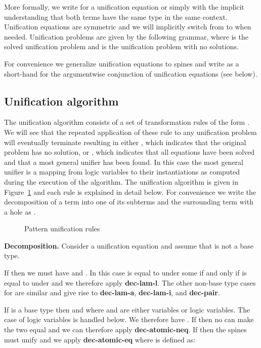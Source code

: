 \documentclass{eptcs}
\theoremstyle{definition}
\begin{document}
More formally, we write  for a unification equation 
or simply  with the implicit understanding that both
terms have the same type in the same context.
Unification equations are symmetric and we will implicitly
switch from  to  when needed.  Unification
problems are given by the following grammar, where  is the
solved unification problem and  is the unification problem
with no solutions.

For convenience we generalize unification equations to spines
and write  as a
short-hand for the argumentwise conjunction of unification equations
(see below).


\subsection{Unification algorithm}\label{sec:unification}
The unification algorithm consists of a set of
transformation rules of the form .   We will see 
that the repeated application of these rule to any unification problem 
will eventually terminate resulting in  either , which indicates that the original problem has
no solution, or , which indicates that all equations have been
solved and that a most general unifier has been found.  In this case the
most general unifier is a mapping from logic variables to their
instantiations as computed during the execution of the
algorithm.  The unification algorithm is given in
Figure~\ref{fig:pat-unif} and each rule is explained in detail below.
For convenience we write the decomposition of a term  into one of
its subterms  and the surrounding term with a hole  as .



\begin{figure}

\caption{Pattern unification rules\label{fig:pat-unif}}
\end{figure} 


\medskip \noindent\textbf{Decomposition.}
Consider a unification equation  and
assume that  is not a base type.

If  then we
must have  and .
In this case  is equal to  under some 
if and only if  is equal to  under  and we therefore
apply \textbf{dec-lam-l}.  The other non-base type cases for  are
similar and give rise to \textbf{dec-lam-a}, \textbf{dec-lam-i}, and
\textbf{dec-pair}.

If  is a base type then  and 
where  and  are either variables or logic variables.  The case
of logic variables is handled below.  We therefore have
.  If  then no 
can make the two equal and we can therefore apply
\textbf{dec-atomic-neq}.  If  then the
spines must unify and we apply \textbf{dec-atomic-eq} where
 is defined as:
\end{document}
